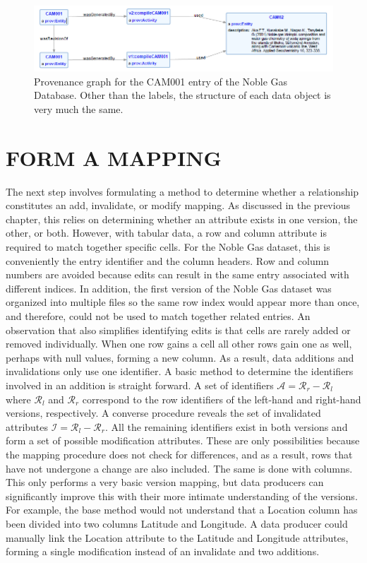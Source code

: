 \begin{figure}
	\centering
	\includegraphics[scale=0.70]{figures/CAM001v1v2.png}
	\caption{Provenance graph for the CAM001 entry of the Noble Gas Database.  Other than the labels, the structure of each data object is very much the same.}
	\label{CAM001ProvGraph}
\end{figure}

\section{FORM A MAPPING} \label{mapping}

The next step involves formulating a method to determine whether a relationship constitutes an add, invalidate, or modify mapping.
As discussed in the previous chapter, this relies on determining whether an attribute exists in one version, the other, or both.
However, with tabular data, a row and column attribute is required to match together specific cells.
For the Noble Gas dataset, this is conveniently the entry identifier and the column headers.
Row and column numbers are avoided because edits can result in the same entry associated with different indices.
In addition, the first version of the Noble Gas dataset was organized into multiple files so the same row index would appear more than once, and therefore, could not be used to match together related entries.
An observation that also simplifies identifying edits is that cells are rarely added or removed individually.
When one row gains a cell all other rows gain one as well, perhaps with null values, forming a new column.
As a result, data additions and invalidations only use one identifier.
A basic method to determine the identifiers involved in an addition is straight forward.
A set of identifiers \(\mathcal{A} = \mathcal{R}_{r} - \mathcal{R}_{l}\) where \(\mathcal{R}_{l}\) and \(\mathcal{R}_{r}\) correspond to the row identifiers of the left-hand and right-hand versions, respectively.
A converse procedure reveals the set of invalidated attributes \(\mathcal{I} = \mathcal{R}_{l} - \mathcal{R}_{r}\).
All the remaining identifiers exist in both versions and form a set of possible modification attributes.
These are only possibilities because the mapping procedure does not check for differences, and as a result, rows that have not undergone a change are also included.
The same is done with columns.
This only performs a very basic version mapping, but data producers can significantly improve this with their more intimate understanding of the versions.
For example, the base method would not understand that a Location column has been divided into two columns Latitude and Longitude.
A data producer could manually link the Location attribute to the Latitude and Longitude attributes, forming a single modification instead of an invalidate and two additions.

